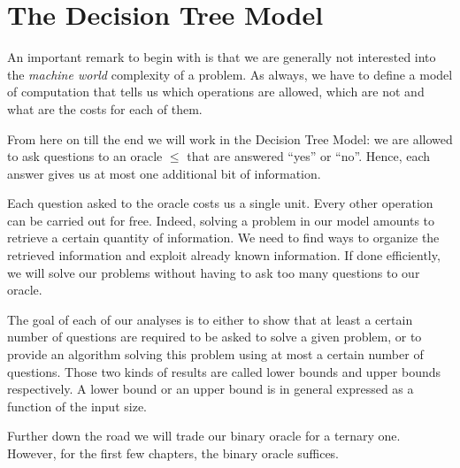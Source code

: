 \section{The Decision Tree Model}
\label{tree:sorting:model}

An important remark to begin with is that we are generally not interested
into the \emph{machine world} complexity of a problem. As always, we have to
define a model of computation that tells us which operations are allowed, which
are not and what are the costs for each of them.

From here on till the end we will work in the Decision Tree Model:
we are allowed to ask questions to an oracle \(\le\) that are answered
``yes'' or ``no''. Hence, each answer gives us at most
one additional bit of information.

Each question asked to the oracle costs us a single unit.
Every other operation can be carried out for free. Indeed, solving a problem in
our model amounts to retrieve a certain quantity of information. We
need to find ways to organize the retrieved information and exploit already
known information. If done efficiently, we will solve our problems without
having to ask too many questions to our oracle.

The goal of each of our analyses is to either to show that at least a certain
number of questions are required to be asked to solve a given problem, or to
provide an algorithm solving this problem using at most a certain number of
questions. Those two kinds of results are called lower bounds and upper bounds
respectively. A lower bound or an upper bound is in general expressed as
a function of the input size.

Further down the road we will trade our binary oracle for a ternary one.
However, for the first few chapters, the binary oracle suffices.

